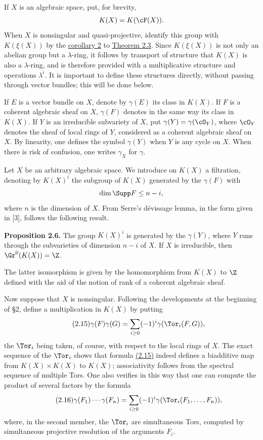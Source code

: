 If $X$ is an algebraic space, put, for brevity,
\[
 K(X)=K(\cF(X)).
\]
When $X$ is nonsingular and quasi-projective, identify this group with $K(\xi(X))$ by the \hyperlink{sga6.e00.cor.2}{corollary 2} to \hyperlink{sga6.e00.thm.2-3}{Theorem 2.3}. Since $K(\xi(X))$ is not only an abelian group but a $\lambda$-ring, it follows by transport of structure that $K(X)$ is also a $\lambda$-ring, and is therefore provided with a multiplicative structure and operations $\lambda^i$. It is important to define these structures directly, without passing through vector bundles; this will be done below.

If $E$ is a vector bundle on $X$, denote by $\gamma(E)$ its class in $K(X)$. If $F$ is a coherent algebraic sheaf on $X$, $\gamma(F)$ denotes in the same way its class in $K(X)$. If $Y$ is an irreducible subvariety of $X$, put $\gamma(Y)=\gamma(\cO_Y)$, where $\cO_Y$ denotes the sheaf of local rings of $Y$, considered as a coherent algebraic sheaf on $X$. By linearity, one defines the symbol $\gamma(Y)$ when $Y$ is any cycle on $X$. When there is risk of confusion, one writes $\gamma_X$ for $\gamma$.

Let $X$ be an arbitrary algebraic space. We introduce on $K(X)$ a filtration, denoting by $K(X)^i$ the subgroup of $K(X)$ generated by the $\gamma(F)$ with
\[
 \dim \Supp F\leq n-i,
\]
where $n$ is the dimension of $X$. From Serre's d\'evissage lemma, in the form given in [3], follows the following result.

\textbf{Proposition 2.6.} The group $K(X)^i$ is generated by the $\gamma(Y)$, where $Y$ runs through the subvarieties of dimension $n-i$ of $X$. If $X$ is irreducible, then $\Gr^0(K(X))=\Z$.

The latter isomorphism is given by the homomorphism from $K(X)$ to $\Z$ defined with the aid of the notion of rank of a coherent algebraic sheaf.

Now suppose that $X$ is nonsingular. Following the developments at the beginning of \S 2, define a multiplication in $K(X)$ by putting
\begin{equation}\tag{2.15}
 \gamma(F)\gamma(G)=\sum_{i\geq 0}(-1)^i\gamma(\Tor_i(F,G)),
\end{equation}
the $\Tor_i$ being taken, of course, with respect to the local rings of $X$. The exact sequence of the $\Tor_i$ shows that formula \hyperlink{sga6.e00.eq.2-15}{(2.15)} indeed defines a biadditive map from $K(X)\times K(X)$ to $K(X)$; associativity follows from the spectral sequence of multiple Tors. One also verifies in this way that one can compute the product of several factors by the formula
\begin{equation}\tag{2.16}
 \gamma(F_1)\cdots\gamma(F_n)=\sum_{i\geq 0}(-1)^i\gamma(\Tor_i(F_1,\ldots,F_n)),
\end{equation}
where, in the second member, the $\Tor_i$ are simultaneous Tors, computed by simultaneous projective resolution of the arguments $F_i$.

